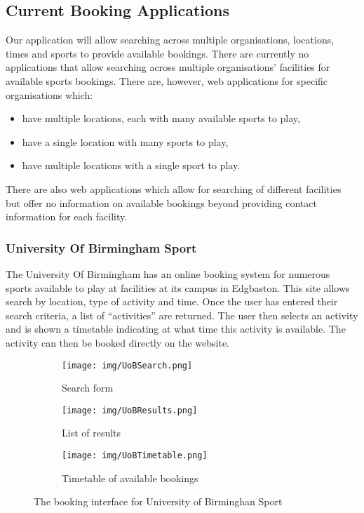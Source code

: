 \subsection{Current Booking Applications}
\label{sub:current_booking_applications}

Our application will allow searching across multiple organisations, locations, times and sports to provide available bookings. There are currently no applications that allow searching across multiple organisations' facilities for available sports bookings. There are, however, web applications for specific organisations which:
\begin{itemize}
        \item have multiple locations, each with many available sports to play,
        \item have a single location with many sports to play,
        \item have multiple locations with a single sport to play.
\end{itemize}
There are also web applications which allow for searching of different facilities but offer no information on available bookings beyond providing contact information for each facility.

\subsubsection{University Of Birmingham Sport}
\label{ssub:university_of_birmingham_sport}

The University Of Birmingham has an online booking system for numerous sports available to play at facilities at its campus in Edgbaston\cite{UOBSport}. This site allows search by location, type of activity and time. Once the user has entered their search criteria, a list of ``activities'' are returned. The user then selects an activity and is shown a timetable indicating at what time this activity is available. The activity can then be booked directly on the website.

\begin{figure}[ht]
\centering
\begin{subfigure}[b]{0.4\textwidth}
                   \texttt{[image: img/UoBSearch.png]}
                   \caption{Search form}\label{fig:UoBSearch}
\end{subfigure}%
\qquad
\begin{subfigure}[b]{0.4\textwidth}
\texttt{[image: img/UoBResults.png]}
\caption{List of results}\label{fig:UoBResults}
            \end{subfigure}
            \qquad
            \begin{subfigure}[b]{0.7\textwidth}
\texttt{[image: img/UoBTimetable.png]}
\caption{Timetable of available bookings}\label{fig:UoBTimetable}
\end{subfigure}
\caption{The booking interface for University of Birminghan Sport}\label{fig:animals}
\end{figure}

